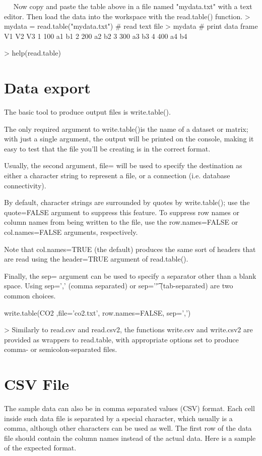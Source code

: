 \documentclass{article}
\begin{document}
 
Now copy and paste the table above in a file named "mydata.txt" with a text editor. Then load the data into the workspace with the read.table() function.
> mydata = read.table("mydata.txt")  # read text file 
> mydata                             # print data frame 
   V1 V2 V3 
1 100 a1 b1 
2 200 a2 b2 
3 300 a3 b3 
4 400 a4 b4 

> help(read.table) 


\section{Data export}
The basic tool to produce output files is write.table().
 
The only required argument to write.table()is the name of a dataset or matrix; with just a single argument, the output will be printed on the console, making it easy to test that the file you’ll be creating is in the correct format. 

Usually, the second argument, file= will be used to specify the destination as either a character string to represent a file, or a connection (i.e. database connectivity).

By default, character strings are surrounded by quotes by write.table(); use the quote=FALSE argument to suppress this feature. To suppress row names or column names from being written to the file, use the row.names=FALSE or col.names=FALSE arguments, respectively. 

Note that col.names=TRUE (the default) produces the same sort of headers that are read using the header=TRUE argument of read.table(). 

Finally, the sep= argument can be used to specify a separator other than a blank space. Using sep=’,’ (comma separated) or sep=’\t’ (tab-separated) are two common choices.


write.table(CO2 ,file=’co2.txt’, row.names=FALSE, sep=’,’)


>
Similarly to read.csv and read.csv2, the functions write.csv and write.csv2 are provided as wrappers to read.table, with appropriate options set to produce comma- or semicolon-separated files. 

\section{CSV File}
The sample data can also be in comma separated values (CSV) format. Each cell inside such data file is separated by a special character, which usually is a comma, although other characters can be used as well.
The first row of the data file should contain the column names instead of the actual data. Here is a sample of the expected format.
\end{document}
